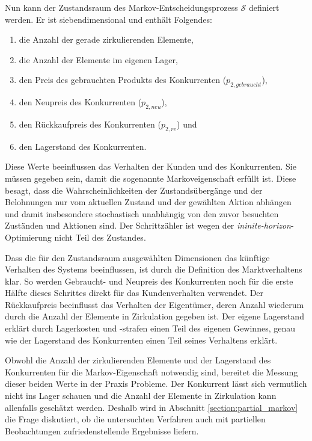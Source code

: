 Nun kann der Zustandsraum des Markov-Entscheidungsprozess $\mathcal{S}$ definiert werden.
Er ist siebendimensional und enthält Folgendes:
\begin{enumerate}
	\item die Anzahl der gerade zirkulierenden Elemente,
	\item die Anzahl der Elemente im eigenen Lager,
	\item den Preis des gebrauchten Produkts des Konkurrenten ($p_{2, gebraucht}$),
	\item den Neupreis des Konkurrenten ($p_{2, neu}$),
	\item den Rückkaufpreis des Konkurrenten ($p_{2, re}$) und
	\item den Lagerstand des Konkurrenten.
\end{enumerate}
Diese Werte beeinflussen das Verhalten der Kunden und des Konkurrenten.
Sie müssen gegeben sein, damit die sogenannte Markoveigenschaft erfüllt ist.
Diese besagt, dass die Wahrscheinlichkeiten der Zustandsübergänge und der Belohnungen nur vom aktuellen Zustand und der gewählten Aktion abhängen und damit insbesondere stochastisch unabhängig von den zuvor besuchten Zuständen und Aktionen sind.
Der Schrittzähler ist wegen der \textit{ininite-horizon}-Optimierung nicht Teil des Zustandes.

Dass die für den Zustandsraum ausgewählten Dimensionen das künftige Verhalten des Systems beeinflussen, ist durch die Definition des Marktverhaltens klar.
So werden Gebraucht- und Neupreis des Konkurrenten noch für die erste Hälfte dieses Schrittes direkt für das Kundenverhalten verwendet.
Der Rückkaufpreis beeinflusst das Verhalten der Eigentümer, deren Anzahl wiederum durch die Anzahl der Elemente in Zirkulation gegeben ist.
Der eigene Lagerstand erklärt durch Lagerkosten und -strafen einen Teil des eigenen Gewinnes, genau wie der Lagerstand des Konkurrenten einen Teil seines Verhaltens erklärt.

Obwohl die Anzahl der zirkulierenden Elemente und der Lagerstand des Konkurrenten für die Markov-Eigenschaft notwendig sind, bereitet die Messung dieser beiden Werte in der Praxis Probleme.
Der Konkurrent lässt sich vermutlich nicht ins Lager schauen und die Anzahl der Elemente in Zirkulation kann allenfalls geschätzt werden.
Deshalb wird in Abschnitt \ref{section:partial_markov} die Frage diskutiert, ob die untersuchten Verfahren auch mit partiellen Beobachtungen zufriedenstellende Ergebnisse liefern.


